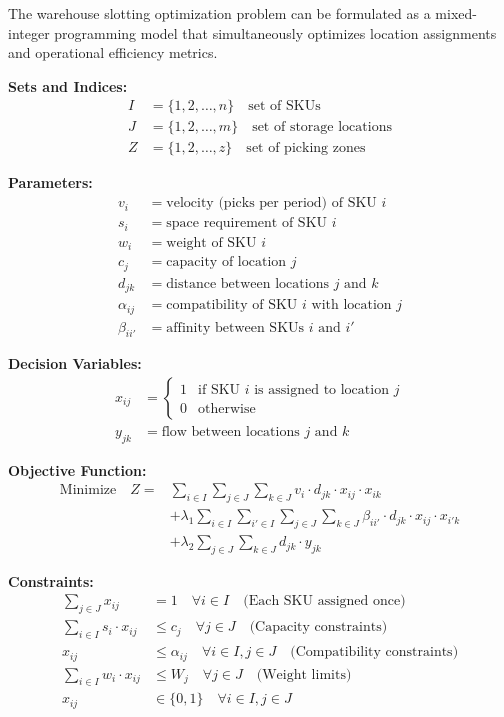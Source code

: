 \documentclass{article}
\begin{document}
The warehouse slotting optimization problem can be formulated as a mixed-integer programming model that simultaneously optimizes location assignments and operational efficiency metrics.

\textbf{Sets and Indices:}
\begin{align}
I &= \{1, 2, \ldots, n\} \quad \text{set of SKUs} \\
J &= \{1, 2, \ldots, m\} \quad \text{set of storage locations} \\
Z &= \{1, 2, \ldots, z\} \quad \text{set of picking zones}
\end{align}

\textbf{Parameters:}
\begin{align}
v_i &= \text{velocity (picks per period) of SKU } i \\
s_i &= \text{space requirement of SKU } i \\
w_i &= \text{weight of SKU } i \\
c_j &= \text{capacity of location } j \\
d_{jk} &= \text{distance between locations } j \text{ and } k \\
\alpha_{ij} &= \text{compatibility of SKU } i \text{ with location } j \\
\beta_{ii'} &= \text{affinity between SKUs } i \text{ and } i'
\end{align}

\textbf{Decision Variables:}
\begin{align}
x_{ij} &= \begin{cases} 
1 & \text{if SKU } i \text{ is assigned to location } j \\
0 & \text{otherwise}
\end{cases} \\
y_{jk} &= \text{flow between locations } j \text{ and } k
\end{align}

\textbf{Objective Function:}
\begin{align}
\text{Minimize} \quad Z = &\sum_{i \in I} \sum_{j \in J} \sum_{k \in J} v_i \cdot d_{jk} \cdot x_{ij} \cdot x_{ik} \\
&+ \lambda_1 \sum_{i \in I} \sum_{i' \in I} \sum_{j \in J} \sum_{k \in J} \beta_{ii'} \cdot d_{jk} \cdot x_{ij} \cdot x_{i'k} \\
&+ \lambda_2 \sum_{j \in J} \sum_{k \in J} d_{jk} \cdot y_{jk}
\end{align}

\textbf{Constraints:}
\begin{align}
\sum_{j \in J} x_{ij} &= 1 \quad \forall i \in I \quad \text{(Each SKU assigned once)} \\
\sum_{i \in I} s_i \cdot x_{ij} &\leq c_j \quad \forall j \in J \quad \text{(Capacity constraints)} \\
x_{ij} &\leq \alpha_{ij} \quad \forall i \in I, j \in J \quad \text{(Compatibility constraints)} \\
\sum_{i \in I} w_i \cdot x_{ij} &\leq W_j \quad \forall j \in J \quad \text{(Weight limits)} \\
x_{ij} &\in \{0, 1\} \quad \forall i \in I, j \in J
\end{align}
\end{document}
